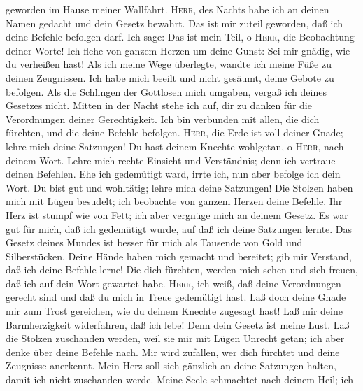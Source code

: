 geworden im Hause meiner Wallfahrt.  \textsc{Herr}, des
Nachts habe ich an deinen Namen gedacht und dein Gesetz bewahrt.
 Das ist mir zuteil geworden, daß ich deine Befehle
befolgen darf.  Ich sage: Das ist mein Teil, o
\textsc{Herr}, die Beobachtung deiner Worte!  Ich flehe
von ganzem Herzen um deine Gunst: Sei mir gnädig, wie du verheißen hast!
 Als ich meine Wege überlegte, wandte ich meine Füße zu
deinen Zeugnissen.  Ich habe mich beeilt und nicht
gesäumt, deine Gebote zu befolgen.  Als die Schlingen der
Gottlosen mich umgaben, vergaß ich deines Gesetzes nicht.
 Mitten in der Nacht stehe ich auf, dir zu danken für die
Verordnungen deiner Gerechtigkeit.  Ich bin verbunden mit
allen, die dich fürchten, und die deine Befehle befolgen.
 \textsc{Herr}, die Erde ist voll deiner Gnade; lehre
mich deine Satzungen!  Du hast deinem Knechte wohlgetan,
o \textsc{Herr}, nach deinem Wort.  Lehre mich rechte
Einsicht und Verständnis; denn ich vertraue deinen Befehlen.
 Ehe ich gedemütigt ward, irrte ich, nun aber befolge ich
dein Wort.  Du bist gut und wohltätig; lehre mich deine
Satzungen!  Die Stolzen haben mich mit Lügen besudelt;
ich beobachte von ganzem Herzen deine Befehle.  Ihr Herz
ist stumpf wie von Fett; ich aber vergnüge mich an deinem Gesetz.
 Es war gut für mich, daß ich gedemütigt wurde, auf daß
ich deine Satzungen lernte.  Das Gesetz deines Mundes ist
besser für mich als Tausende von Gold und Silberstücken. 
Deine Hände haben mich gemacht und bereitet; gib mir Verstand, daß ich
deine Befehle lerne!  Die dich fürchten, werden mich
sehen und sich freuen, daß ich auf dein Wort gewartet habe.
 \textsc{Herr}, ich weiß, daß deine Verordnungen gerecht
sind und daß du mich in Treue gedemütigt hast.  Laß doch
deine Gnade mir zum Trost gereichen, wie du deinem Knechte zugesagt
hast!  Laß mir deine Barmherzigkeit widerfahren, daß ich
lebe! Denn dein Gesetz ist meine Lust.  Laß die Stolzen
zuschanden werden, weil sie mir mit Lügen Unrecht getan; ich aber denke
über deine Befehle nach.  Mir wird zufallen, wer dich
fürchtet und deine Zeugnisse anerkennt.  Mein Herz soll
sich gänzlich an deine Satzungen halten, damit ich nicht zuschanden
werde.  Meine Seele schmachtet nach deinem Heil; ich
